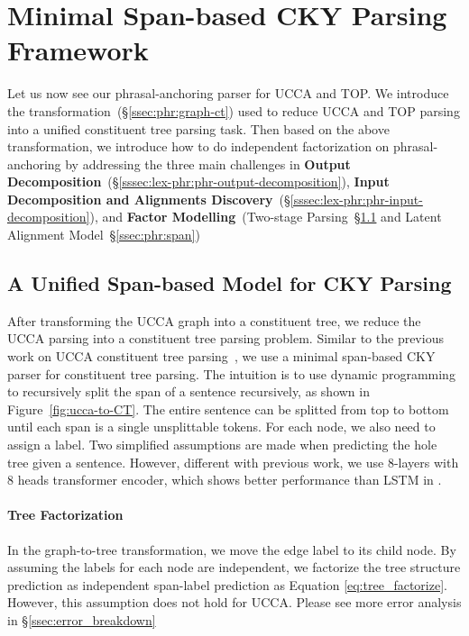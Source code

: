 \section{Minimal Span-based CKY Parsing Framework}
\label{sec:lex-phr:cky-based}

Let us now see our phrasal-anchoring parser for UCCA and TOP. We
introduce the transformation~(\S\ref{ssec:phr:graph-ct}) used to reduce
UCCA and TOP parsing into a unified constituent tree parsing task. Then
based on the above transformation, we introduce how to do independent
factorization on phrasal-anchoring by addressing the three main
challenges in \textbf{Output
  Decomposition}~(\S\ref{sssec:lex-phr:phr-output-decomposition}),
\textbf{Input Decomposition and Alignments
  Discovery}~(\S\ref{sssec:lex-phr:phr-input-decomposition}), and
\textbf{Factor Modelling}~(Two-stage
Parsing~\S\ref{ssec:phr:cky} and Latent Alignment
Model~\S\ref{ssec:phr:span})





\subsection{A Unified Span-based Model for CKY Parsing}
\label{ssec:phr:cky}
After transforming the UCCA graph into a constituent tree, we reduce
the UCCA parsing into a constituent tree parsing problem. Similar to
the previous work on UCCA constituent tree
parsing~\cite{jiang2019hlt}, we use a minimal span-based CKY parser
for constituent tree parsing.  The intuition is to use dynamic
programming to recursively split the span of a sentence recursively,
as shown in Figure~\ref{fig:ucca-to-CT}. The entire sentence can be
splitted from top to bottom until each span is a single unsplittable
tokens. For each node, we also need to assign a label. Two simplified
assumptions are made when predicting the hole tree given a
sentence. However, different with previous work, we use 8-layers with
8 heads transformer encoder, which shows better performance than LSTM
in \citet{kitaev2018constituency}.

\paragraph{Tree Factorization} In the graph-to-tree transformation, we
move the edge label to its child node. By assuming the labels for each
node are independent, we factorize the tree structure prediction as
independent span-label prediction as Equation
\ref{eq:tree_factorize}. However, this assumption does not hold for UCCA.
Please see more error analysis in \S \ref{ssec:error_breakdown}

